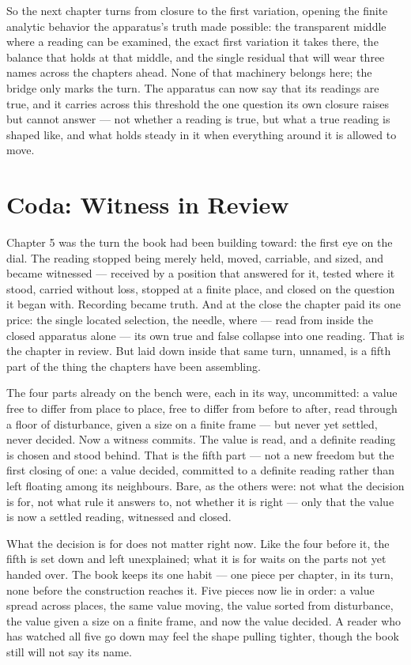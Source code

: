 So the next chapter turns from closure to the first variation, opening the finite analytic behavior the apparatus's truth made possible: the transparent middle where a reading can be examined, the exact first variation it takes there, the balance that holds at that middle, and the single residual that will wear three names across the chapters ahead. None of that machinery belongs here; the bridge only marks the turn. The apparatus can now say that its readings are true, and it carries across this threshold the one question its own closure raises but cannot answer --- not whether a reading is true, but what a true reading is shaped like, and what holds steady in it when everything around it is allowed to move.

\section*{Coda: Witness in Review}

Chapter 5 was the turn the book had been building toward: the first eye on the dial. The reading stopped being merely held, moved, carriable, and sized, and became witnessed --- received by a position that answered for it, tested where it stood, carried without loss, stopped at a finite place, and closed on the question it began with. Recording became truth. And at the close the chapter paid its one price: the single located selection, the needle, where --- read from inside the closed apparatus alone --- its own true and false collapse into one reading. That is the chapter in review. But laid down inside that same turn, unnamed, is a fifth part of the thing the chapters have been assembling.

The four parts already on the bench were, each in its way, uncommitted: a value free to differ from place to place, free to differ from before to after, read through a floor of disturbance, given a size on a finite frame --- but never yet settled, never decided. Now a witness commits. The value is read, and a definite reading is chosen and stood behind. That is the fifth part --- not a new freedom but the first closing of one: a value decided, committed to a definite reading rather than left floating among its neighbours. Bare, as the others were: not what the decision is for, not what rule it answers to, not whether it is right --- only that the value is now a settled reading, witnessed and closed.

What the decision is for does not matter right now. Like the four before it, the fifth is set down and left unexplained; what it is for waits on the parts not yet handed over. The book keeps its one habit --- one piece per chapter, in its turn, none before the construction reaches it. Five pieces now lie in order: a value spread across places, the same value moving, the value sorted from disturbance, the value given a size on a finite frame, and now the value decided. A reader who has watched all five go down may feel the shape pulling tighter, though the book still will not say its name.

